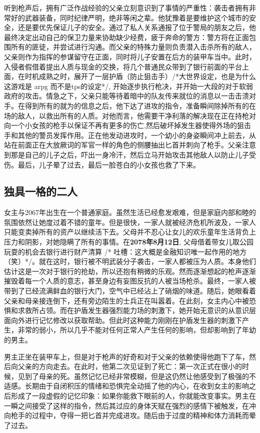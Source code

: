 \documentclass[12pt, a4paper]{article}
\begin{document}
        听到枪声后，拥有广泛作战经验的父亲立刻意识到了事情的严重性：袭击者拥有非常好的武器装备，同时纪律严明，绝非等闲之辈。他犹豫着是要维护这个城市的安全，还是要优先保证儿子的安全。通过了私人关系通报了位于警局的朋友之后，他最终决定出动自己的保卫力量来协助缺少经费，疲于奔命的警方：警方将在正面包围所有的匪徒，并尝试进行沟通。而父亲的特殊力量则负责潜入击杀所有的敌人，父亲则作为指挥的参谋留守在正面，同时将儿子安置在后方的装甲车当中。此时，入侵者假借着提出人质与现金的交换，将几个普通民众带到了银行前面的平台上面，在时机成熟之时，展开了一层护盾（防止狙击手）/*大世界设定，也是为什么这游戏是 arpg 而不是tps的设定*/, 开始逐步执行枪决，并开始一大段的对于软弱政府的攻击。情急之下，父亲只能等待着暗中的队友传来就位的消息以一击击溃对手。在得到所有的就为的信息之后，他下达了进攻的指令，准备瞬间除掉所有的在场的敌人，以救出所有的人质。对他而言，他需要干净利落的解决现在正在持枪对向一个小女孩的枪手以保证不再有更多的伤亡,然后破坏掉发生器使得外场的狙击手和其他的警员发挥作用。正在他发动进攻时，一个幼小的身姿瞬间冲上前去，从站在前面正在大放厥词的军官一样的角色的侧腰抽出匕首并刺向了枪手。父亲注意到那是自己的儿子之后，吓出一身冷汗，然后立马开始攻击其他敌人以防止儿子受伤。最后，儿子晕了过去，最后一脸苍白的小女孩也救了下来。

    \subsection*{独具一格的二人}
        女主与2067年出生在一个普通家庭。虽然生活已经愈发艰难，但是家庭内部和睦的氛围依然让她度过着不错的童年。但是很快，一家人就被经济危机所波及，一家人只能变卖掉所有的资产以继续活下去。父母并不忍心让女儿的欢乐童年生活背负上压力和阴影，对她隐瞒了所有的事情。在\textbf{2078年8月12日}, 父母借着带女儿取公园玩耍的机会去银行进行财产清算 /* 吐槽：这大概是金融知识唯一起作用的地方（笑）*/。就在这时，银行被不明武装分子袭击，一家人都被压为人质。本身他们估计这是一次对于银行的抢劫，所以还抱有稍微的乐观。然而逐渐想起的枪声逐渐摧毁着每一个人质的意志，甚至身边有妄图反抗的人被当场枪杀。最终，一家人被带到了已经流满鲜血的银行大门，空气中已经沾上了硝烟的味道。随后，她眼看着父亲和母亲接连倒下，还有旁边陌生的士兵正在叫嚣着。在此刻，女主内心中被恐惧和求救所占领。而在护盾发生器强烈能力场的刺激下，她开始无意识的从意识层面向外进行记忆修改以获取帮助。但此时这种能力刚刚在护盾发生器的刺激下产生，非常的弱小，所以几乎不能对任何正常人产生任何的影响，但却影响到了年幼的男主。

        男主正坐在装甲车上，但是对于枪声的好奇和对于父亲的依赖使得他跑下了车，然后向父亲的方向走去。在此时，他第二次见证到了死亡：第一次正式在很小的时候，见到了母亲的死。虽然记忆已经非常模糊，但是这仍然让他感受到了极强的不适感。长期由于自闭积压的情绪和恐惧完全动摇了他的内心，在收到女主的影响之后形成了一段虚假的记忆印象：如果你能救下眼前的人，你就能改变事实。男主在一瞬之间接受了这样的指令，然后其过应的身体天赋在强烈的感情下被触发，在冲向枪手的过程中，夺得一把匕首并完成进攻。随后由于过度的精神和体力消耗而晕了过去。
\end{document}
